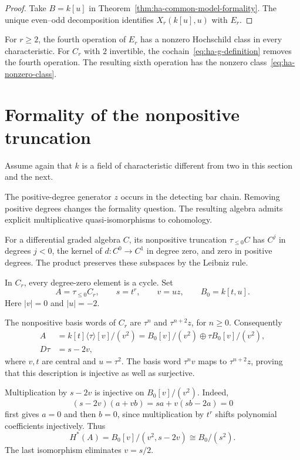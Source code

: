 \begin{proof}
Take $B=k[u]$ in Theorem~\ref{thm:ha-common-model-formality}.
The unique even--odd decomposition identifies $X_r(k[u],u)$ with $E_r$.
\end{proof}

For $r\geq2$, the fourth operation of $E_r$ has a nonzero
Hochschild class in every characteristic.
For $C_r$ with $2$ invertible, the cochain~\eqref{eq:ha-g-definition}
removes the fourth operation.
The resulting sixth operation has the nonzero class~\eqref{eq:ha-nonzero-class}.

\section{Formality of the nonpositive truncation}
\label{sec:ha-truncation}

Assume again that $k$ is a field of characteristic different from two
in this section and the next.

The positive-degree generator $z$ occurs in the detecting bar chain.
Removing positive degrees changes the formality question. The resulting
algebra admits explicit multiplicative quasi-isomorphisms to cohomology.

For a differential graded algebra $C$, its nonpositive truncation
$\tau_{\leq0}C$ has $C^j$ in degrees $j<0$, the kernel of
$d:C^0\to C^1$ in degree zero, and zero in positive degrees.
The product preserves these subspaces by the Leibniz rule.

In $C_r$, every degree-zero element is a cycle. Set
\[
 A=\tau_{\leq0}C_r,\qquad s=t^r,\qquad v=uz,\qquad B_0=k[t,u].
\]
Here $|v|=0$ and $|u|=-2$.

The nonpositive basis words of $C_r$
are $\tau^n$ and $\tau^{n+2}z$, for $n\geq0$.
Consequently
\[
 \begin{split}
 A&=k[t]\langle\tau\rangle[v]/(v^2)
   =B_0[v]/(v^2)\oplus\tau B_0[v]/(v^2),\\
 D\tau&=s-2v,
 \end{split}
\]
where $v,t$ are central and $u=\tau^2$.
The basis word $\tau^nv$ maps to $\tau^{n+2}z$, proving that
this description is injective as well as surjective.

Multiplication by $s-2v$ is injective on $B_0[v]/(v^2)$.
Indeed,
\[
 (s-2v)(a+vb)=sa+v(sb-2a)=0
\]
first gives $a=0$ and then $b=0$, since multiplication by $t^r$
shifts polynomial coefficients injectively. Thus
\[
 H^*(A)=B_0[v]/(v^2,s-2v)\cong B_0/(s^2).
\]
The last isomorphism eliminates $v=s/2$.

